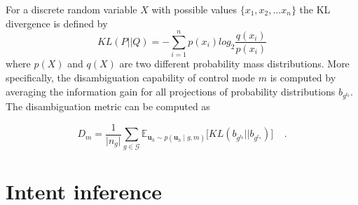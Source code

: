 \documentclass[letterpaper, 10 pt, conference]{ieeeconf}  %
\begin{document}
For a discrete random variable $X$ with possible values $\{x_1, x_2,\dots x_n\}$ the KL divergence is defined by
\begin{equation*}
	KL(P||Q) = -\sum_{i=1}^{n}p(x_i)log_2\frac{q(x_i)}{p(x_i)}
\end{equation*}
where $p(X)$ and $q(X)$ are two different probability mass distributions. 
More specifically, the disambiguation capability of control mode $m$ is computed by averaging the information gain for all projections of probability distributions $b_{g^{t_b}}$.  The disambiguation metric can be computed as 

\begin{equation}\label{eq:kldiv}
	D_m = \frac{1}{\vert n_g \vert} \sum_{g \in \mathcal{G}}^{} \mathbb{E}_{\boldsymbol{u}_h \sim p(\boldsymbol{u}_h \; | \; g, m)}\Big[KL(b_{g^{t_b}}||b_{g^{t_a}})\Big] \;\;\;\;.
\end{equation}



%		
%		
%		
%		
%		


\section{Intent inference}\label{sec:inference}
\end{document}
